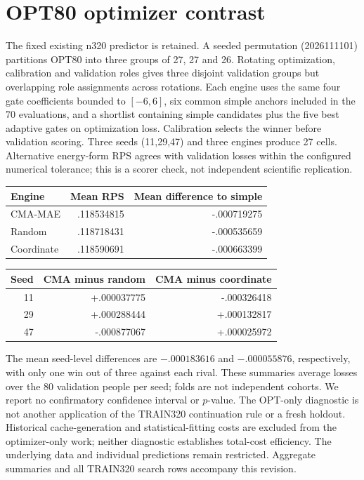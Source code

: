 \documentclass[10pt]{article}
\begin{document}
\section{OPT80 optimizer contrast}
The fixed existing n320 predictor is retained. A seeded permutation (2026111101) partitions OPT80 into three groups of 27, 27 and 26. Rotating optimization, calibration and validation roles gives three disjoint validation groups but overlapping role assignments across rotations. Each engine uses the same four gate coefficients bounded to $[-6,6]$, six common simple anchors included in the 70 evaluations, and a shortlist containing simple candidates plus the five best adaptive gates on optimization loss. Calibration selects the winner before validation scoring. Three seeds (11,29,47) and three engines produce 27 cells. Alternative energy-form RPS agrees with validation losses within the configured numerical tolerance; this is a scorer check, not independent scientific replication.
\begin{center}\begin{tabular}{lrr}\toprule
Engine & Mean RPS & Mean difference to simple\\\midrule
CMA-MAE & .118534815 & -.000719275\\
Random & .118718431 & -.000535659\\
Coordinate & .118590691 & -.000663399\\\bottomrule
\end{tabular}\end{center}
\begin{center}\begin{tabular}{rrr}\toprule
Seed & CMA minus random & CMA minus coordinate\\\midrule
11 & +.000037775 & -.000326418\\
29 & +.000288444 & +.000132817\\
47 & -.000877067 & +.000025972\\\bottomrule
\end{tabular}\end{center}
The mean seed-level differences are $-.000183616$ and $-.000055876$, respectively, with only one win out of three against each rival. These summaries average losses over the 80 validation people per seed; folds are not independent cohorts. We report no confirmatory confidence interval or $p$-value. The OPT-only diagnostic is not another application of the TRAIN320 continuation rule or a fresh holdout. Historical cache-generation and statistical-fitting costs are excluded from the optimizer-only work; neither diagnostic establishes total-cost efficiency. The underlying data and individual predictions remain restricted. Aggregate summaries and all TRAIN320 search rows accompany this revision.
\end{document}
